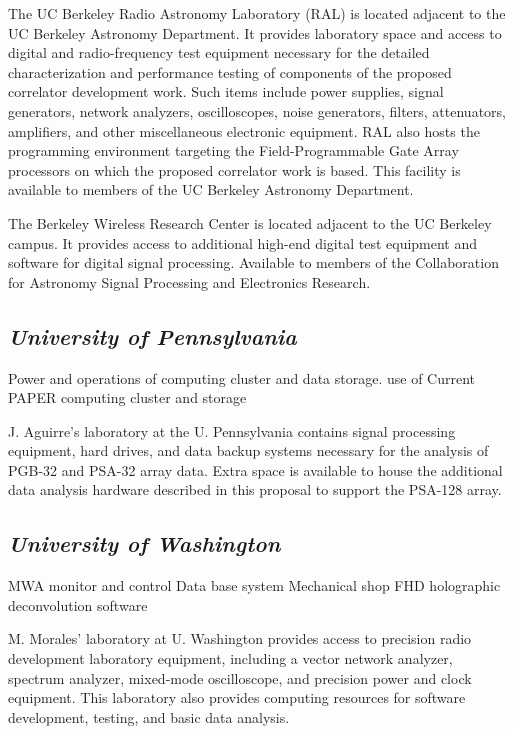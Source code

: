 \documentclass[11pt]{article}
\begin{document}

The UC Berkeley Radio Astronomy Laboratory (RAL) is located adjacent to the UC
Berkeley Astronomy Department. It provides laboratory space and access to
digital and radio-frequency test equipment necessary for the detailed
characterization and performance testing of components of the proposed correlator
development work. Such items include power supplies, signal generators, network
analyzers, oscilloscopes, noise generators, filters, attenuators, amplifiers,
and other miscellaneous electronic equipment. RAL also hosts the programming
environment targeting the Field-Programmable Gate Array processors on which the
proposed correlator work is based. This facility is available to members of the
UC Berkeley Astronomy Department.

The Berkeley Wireless Research Center is located adjacent to the UC Berkeley
campus. It provides access to additional high-end digital test equipment and
software for digital signal processing.  Available to members of the
Collaboration for Astronomy Signal Processing and Electronics Research.

\subsection*{\it University of Pennsylvania}

Power and operations of computing cluster and data storage.
use of Current PAPER computing cluster and storage

J. Aguirre’s laboratory at the U. Pennsylvania contains signal processing
equipment, hard drives, and data backup systems necessary for the analysis of
PGB-32 and PSA-32 array data. Extra space is available to house the additional
data analysis hardware described in this proposal to support the PSA-128 array.

\subsection{\it University of Washington}

MWA monitor and control Data base system
Mechanical shop
FHD holographic deconvolution software

M. Morales' laboratory at U. Washington provides access to precision radio
development laboratory equipment, including
a vector network analyzer, spectrum analyzer, mixed-mode oscilloscope, and
precision power and clock equipment.  This laboratory also provides computing
resources for software development, testing, and basic data analysis.
\end{document}
